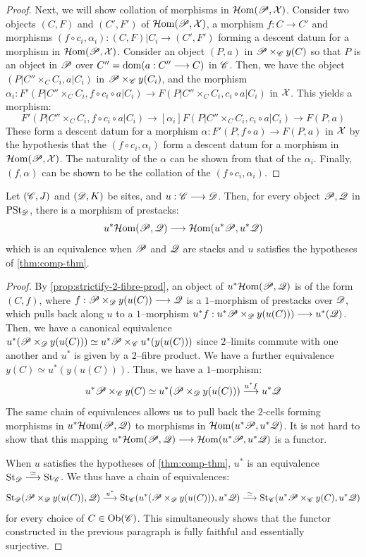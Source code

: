 \documentclass[11pt]{amsart}
\begin{document}
\begin{proof}
Next, we will show collation of morphisms in $\mathcal{H}\mathrm{om}(\mathscr{P}, \mathcal{X})$.
Consider two objects $(C, F)$ and $(C', F')$ of $\mathcal{H}\mathrm{om}(\mathscr{P}, \mathcal{X})$, a morphism $f : C \to C'$ and
morphisms $(f \circ c_i, \alpha_i) : (C, F)|C_i \to (C', F')$ forming a descent datum for a morphism
in $\mathcal{H}\mathrm{om}(\mathscr{P}, \mathcal{X})$. Consider an object $(P, a)$ in $\mathscr{P} \times_{\mathscr{C}} y(C)$ so that
$P$ is an object in $\mathscr{P}$ over $C'' = \dom(a : C'' \to C)$ in $\mathscr{C}$. Then, we have the object
$(P|C'' \times_C C_i, a|C_i)$ in $\mathscr{P} \times_\mathscr{C} y(C_i)$, and the morphism
$\alpha_i : F'(P|C'' \times_C C_i, f \circ c_i \circ a|C_i)
\to F(P|C'' \times_C C_i, c_i \circ a|C_i)$
in $\mathcal{X}$. This yields a morphism:
\[
F'(P|C'' \times_C C_i, f \circ c_i \circ a|C_i)
    \to[\alpha_i] F(P|C'' \times_C C_i, c_i \circ a|C_i)
    \to F(P, a)
\]
These form a descent datum for a morphism $\alpha : F'(P, f \circ a) \to F(P, a)$ in $\mathcal{X}$
by the hypothesis that the $(f \circ c_i, \alpha_i)$ form a descent datum for a morphism
in $\mathcal{H}\mathrm{om}(\mathscr{P}, \mathcal{X})$. The naturality of the $\alpha$ can be shown from that of the
$\alpha_i$. Finally, $(f, \alpha)$ can be shown to be the collation of the
$(f \circ c_i, \alpha_i)$.
\end{proof}

\begin{prop}
Let $(\mathscr{C}, J)$ and $(\mathscr{D}, K)$ be sites, and $u : \sC \to \sD$.
Then, for every object $\mathscr{P}, \mathscr{Q}$ in $\mathrm{PSt}_{\mathscr{D}}$, there is a morphism of prestacks:
\[
u^*\HHom(\sP, \sQ) \to \HHom(u^*\sP, u^*\sQ)
\]
which is an equivalence when $\mathscr{P}$ and $\mathscr{Q}$ are stacks and $u$ satisfies the hypotheses of
\cref{thm:comp-thm}.
\end{prop}
\begin{proof}
By \cref{prop:strictify-2-fibre-prod}, an object of $u^*\mathcal{H}\mathrm{om}(\mathscr{P}, \mathscr{Q})$ is of the form
$(C, f)$, where $f : \sP \times_\sD y(u(C)) \to \sQ$ is a $1$--morphism of prestacks over $\mathscr{D}$,
which pulls back along $u$ to a $1$--morphism $u^*f : u^*\sP \times_\sD y(u(C))) \to u^*(\sQ)$.
Then, we have a canonical equivalence
$u^*(\mathscr{P} \times_\mathscr{D} y(u(C))) \simeq u^*\mathscr{P} \times_\mathscr{C} u^*(y(u(C)))$
since $2$--limits commute with one another and $u^*$ is given by a $2$--fibre product.
We have a further equivalence $y(C) \simeq u^*(y(u(C)))$.
Thus, we have a $1$--morphism:
\[
u^*\sP \times_\sC y(C) \simeq u^*(\sP \times_\sD y(u(C))) \to[u^*f] u^*\sQ
\]
The same chain of equivalences allows us to pull back the $2$-cells forming morphisms in
$u^*\mathcal{H}\mathrm{om}(\mathscr{P}, \mathscr{Q})$ to morphisms in $\mathcal{H}\mathrm{om}(u^*\mathscr{P}, u^*\mathscr{Q})$. It is not hard to show that
this mapping $u^*\HHom(\sP, \sQ) \to \HHom(u^*\sP, u^*\sQ)$ is a functor.

When $u$ satisfies the hypotheses of \cref{thm:comp-thm}, $u^*$ is an equivalence
$\St_{\sD} \to[\simeq] \St_{\sC}$.
We thus have a chain of equivalences:
\[
\St_{\sD}(\sP \times_\sD y(u(C)), \sQ)
\to[u^*] \St_{\sC}(u^*(\sP \times_\sD y(u(C))), u^*\sQ)
\to[\simeq] \St_{\sC}(u^*\sP \times_\sC y(C), u^*\sQ)
\]
for every choice of $C \in \Ob{\sC}$. This simultaneously shows that the functor constructed
in the previous paragraph is fully faithful and essentially surjective.
\end{proof}
\end{document}
